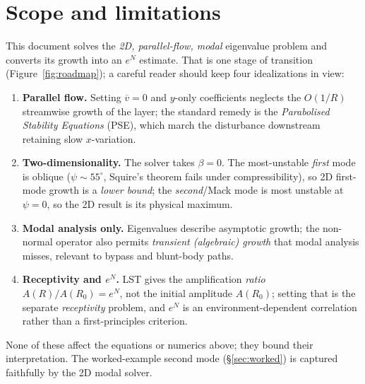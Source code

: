 \documentclass[11pt]{article}
\renewcommand{\bar}[1]{\overline{#1}}
\begin{document}
\section{Scope and limitations}\label{sec:scope}
This document solves the \emph{2D, parallel-flow, modal} eigenvalue problem and converts its growth into an
$e^N$ estimate. That is one stage of transition (Figure~\ref{fig:roadmap}); a careful reader should keep four
idealizations in view:
\begin{enumerate}[nosep,leftmargin=1.9em]
  \item \textbf{Parallel flow.} Setting $\bar v=0$ and $y$-only coefficients neglects the $O(1/R)$ streamwise
        growth of the layer; the standard remedy is the \emph{Parabolised Stability Equations} (PSE), which
        march the disturbance downstream retaining slow $x$-variation.
  \item \textbf{Two-dimensionality.} The solver takes $\beta=0$. The most-unstable \emph{first} mode is
        oblique ($\psi\!\sim\!55^\circ$, Squire's theorem fails under compressibility), so 2D first-mode
        growth is a \emph{lower bound}; the \emph{second}/Mack mode is most unstable at $\psi=0$, so the 2D
        result is its physical maximum.
  \item \textbf{Modal analysis only.} Eigenvalues describe asymptotic growth; the non-normal operator also
        permits \emph{transient (algebraic) growth} that modal analysis misses, relevant to bypass and
        blunt-body paths.
  \item \textbf{Receptivity and $e^N$.} LST gives the amplification \emph{ratio} $A(R)/A(R_0)=e^N$, not the
        initial amplitude $A(R_0)$; setting that is the separate \emph{receptivity} problem, and $e^N$ is an
        environment-dependent correlation rather than a first-principles criterion.
\end{enumerate}
None of these affect the equations or numerics above; they bound their interpretation. The worked-example
second mode (\S\ref{sec:worked}) is captured faithfully by the 2D modal solver.
\end{document}
